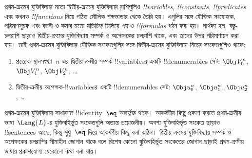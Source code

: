 \documentclass[../../../include/open-logic-section]{subfiles}
\begin{document}


প্রথম-ক্রমের যুক্তিবিদ্যার মতো দ্বিতীয়-ক্রমের যুক্তিবিদ্যার রাশিগুলিও
\emph{!!{variable}s}, \emph{!!{constant}s}, \emph{!!{predicate}s}
এবং কখনও \emph{!!{function}s} নিয়ে গঠিত মৌলিক শব্দভান্ডার থেকে
তৈরি হয়। এগুলির সঙ্গে যৌক্তিক সংযোজক, পরিমাণসূচক এবং বন্ধনী ও
কমার মতো যতিচিহ্ন মিলিয়ে \emph{পদ} ও \emph{!!{formula}s} গঠন করা
হয়। পার্থক্য হল, বস্তু-চলরাশি ছাড়াও দ্বিতীয়-ক্রমের যুক্তিবিদ্যায়
সম্পর্ক ও অপেক্ষকের চলরাশি থাকে, এবং তাদের উপর পরিমাণায়ন করা যায়।
তাই প্রথম-ক্রমের যুক্তিবিদ্যার যৌক্তিক সংকেতগুলির সঙ্গে
দ্বিতীয়-ক্রমের যুক্তিবিদ্যায় নিচের সংকেতগুলিও থাকে:

\begin{enumerate}
\item প্রত্যেক স্থানসংখ্যা~$n$-এর দ্বিতীয়-ক্রমীয় সম্পর্ক-!!{variable}sর
  একটি !!{denumerable}s সেট:
  $\Obj V_0^n$, $\Obj V_1^n$, $\Obj V_2^n$, \dots
\item দ্বিতীয়-ক্রমীয় অপেক্ষক-!!{variable}sর একটি !!{denumerable}s সেট:
  $\Obj u_0^n$, $\Obj u_1^n$, $\Obj u_2^n$, \dots
\end{enumerate}

প্রথম-ক্রমের যুক্তিবিদ্যায় সাধারণত !!{identity}~$\eq$ অন্তর্ভুক্ত
থাকে। আকর্ষণীয় কিছু প্রকাশ করতে প্রথম-ক্রমীয় ভাষা~$\Lang{L}$-র
যুক্তিবহির্ভূত সংকেতগুলি অত্যন্ত প্রয়োজনীয়। অবশ্য যুক্তিবহির্ভূত
সংকেত ছাড়াও !!{sentences} আছে, কিন্তু শুধু~$\eq$ দিয়ে আকর্ষণীয়
কিছু বলা কঠিন। দ্বিতীয়-ক্রমের যুক্তিবিদ্যায় সম্পর্ক ও অপেক্ষকের
চলরাশির সীমাহীন জোগান থাকে বলে বিশেষ কোনো যুক্তিবহির্ভূত সংকেতের
জোগান ছাড়াই প্রথম-ক্রমীয় ভাষায় প্রকাশযোগ্য যেকোনো কথা বলা যায়।
\end{document}
